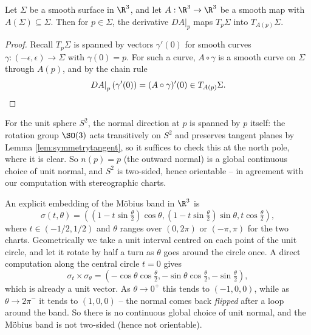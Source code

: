 \begin{lemma}\label{lem:symmetrytangent}
    Let $\Sigma$ be a smooth surface in $\R^3$, and let $A: \R^3 \rightarrow \R^3$ be a smooth map with $A(\Sigma) \subseteq \Sigma$. Then for $p \in \Sigma$, the derivative $\left.DA\right|_p$ maps $T_p \Sigma$ into $T_{A(p)} \Sigma$.
\end{lemma}
\begin{proof}
    Recall $T_p\Sigma$ is spanned by vectors $\gamma'(0)$ for smooth curves $\gamma: (-\epsilon, \epsilon) \rightarrow \Sigma$ with $\gamma(0) = p$. For such a curve, $A \circ \gamma$ is a smooth curve on $\Sigma$ through $A(p)$, and by the chain rule
    $$
    \left.DA\right|_p (\gamma'(0)) = (A \circ \gamma)'(0) \in T_{A(p)} \Sigma. \qedhere
    $$
\end{proof}

\begin{example}
    For the unit sphere $S^2$, the normal direction at $p$ is spanned by $p$ itself: the rotation group $\SO(3)$ acts transitively on $S^2$ and preserves tangent planes by Lemma \ref{lem:symmetrytangent}, so it suffices to check this at the north pole, where it is clear. So $n(p) = p$ (the outward normal) is a global continuous choice of unit normal, and $S^2$ is two-sided, hence orientable -- in agreement with our computation with stereographic charts.
\end{example}

\begin{example}
    An explicit embedding of the M\"obius band in $\R^3$ is
    $$
    \sigma(t, \theta) = \left(\left(1 - t \sin \tfrac{\theta}{2}\right) \cos\theta, \left(1 - t \sin \tfrac{\theta}{2}\right) \sin\theta, t \cos\tfrac{\theta}{2}\right),
    $$
    where $t \in (-1/2, 1/2)$ and $\theta$ ranges over $(0, 2\pi)$ or $(-\pi, \pi)$ for the two charts. Geometrically we take a unit interval centred on each point of the unit circle, and let it rotate by half a turn as $\theta$ goes around the circle once. A direct computation along the central circle $t = 0$ gives
    $$
    \sigma_t \times \sigma_\theta = \left(-\cos\theta\cos\tfrac{\theta}{2}, -\sin\theta\cos\tfrac{\theta}{2}, -\sin\tfrac{\theta}{2}\right),
    $$
    which is already a unit vector. As $\theta \rightarrow 0^+$ this tends to $(-1, 0, 0)$, while as $\theta \rightarrow 2\pi^-$ it tends to $(1, 0, 0)$ -- the normal comes back \emph{flipped} after a loop around the band. So there is no continuous global choice of unit normal, and the M\"obius band is not two-sided (hence not orientable).
\end{example}


